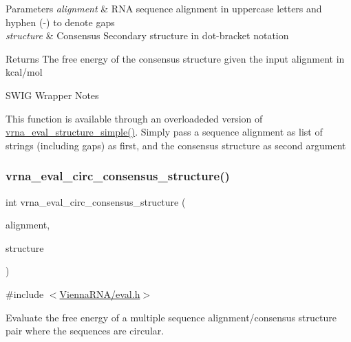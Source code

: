 \begin{DoxyParams}{Parameters}
{\em alignment} & R\+NA sequence alignment in uppercase letters and hyphen (\textquotesingle{}-\/\textquotesingle{}) to denote gaps \\
\hline
{\em structure} & Consensus Secondary structure in dot-\/bracket notation \\
\hline
\end{DoxyParams}
\begin{DoxyReturn}{Returns}
The free energy of the consensus structure given the input alignment in kcal/mol
\end{DoxyReturn}
\begin{DoxyRefDesc}{S\+W\+I\+G Wrapper Notes}
\item[\mbox{\hyperlink{wrappers__wrappers000039}{S\+W\+I\+G Wrapper Notes}}]This function is available through an overloadeded version of \mbox{\hyperlink{group__eval_ga7e5273464b775d4130245681312c1369}{vrna\+\_\+eval\+\_\+structure\+\_\+simple()}}. Simply pass a sequence alignment as list of strings (including gaps) as first, and the consensus structure as second argument \end{DoxyRefDesc}
\mbox{\label{group__eval_gac96577cf232c71160f762737a994b7c6}} 
\subsubsection{\texorpdfstring{vrna\+\_\+eval\+\_\+circ\+\_\+consensus\+\_\+structure()}{vrna\_eval\_circ\_consensus\_structure()}}
{\footnotesize\ttfamily int vrna\+\_\+eval\+\_\+circ\+\_\+consensus\+\_\+structure (\begin{DoxyParamCaption}\item[{const char $\ast$$\ast$}]{alignment,  }\item[{const char $\ast$}]{structure }\end{DoxyParamCaption})}



{\ttfamily \#include $<$\mbox{\hyperlink{eval_8h}{Vienna\+R\+N\+A/eval.\+h}}$>$}



Evaluate the free energy of a multiple sequence alignment/consensus structure pair where the sequences are circular. 

